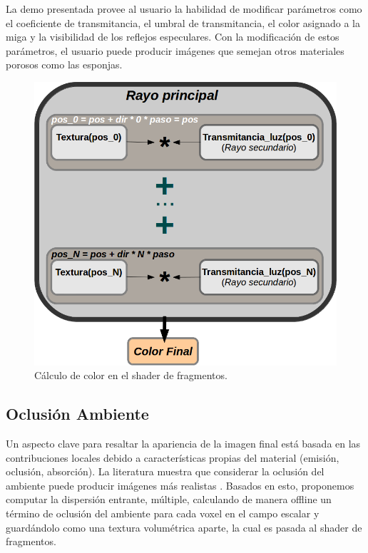La demo presentada provee al usuario la habilidad de modificar parámetros como el coeficiente de transmitancia, el umbral de transmitancia, el color asignado a la miga y la visibilidad de los reflejos especulares.
Con la modificación de estos parámetros, el usuario puede producir imágenes que semejan otros materiales porosos como las esponjas.

\begin{figure}[htb!]
  \centerline{\includegraphics[width=13cm]{fragmentshader}}
  \caption{Cálculo de color en el shader de fragmentos. }
  \label{fg:fragmentshader}
\end{figure}


\subsection*{Oclusión Ambiente}

Un aspecto clave para resaltar la apariencia de la imagen final está basada en las contribuciones locales debido a características propias del material (emisión, oclusión, absorción).
La literatura muestra que considerar la oclusión del ambiente puede producir imágenes más realistas \cite{Hernell2010}.
Basados en esto, proponemos computar la dispersión entrante, múltiple, calculando de manera offline un término de oclusión del ambiente para cada voxel en el campo escalar y guardándolo como una textura volumétrica aparte, la cual es pasada al shader de fragmentos.

